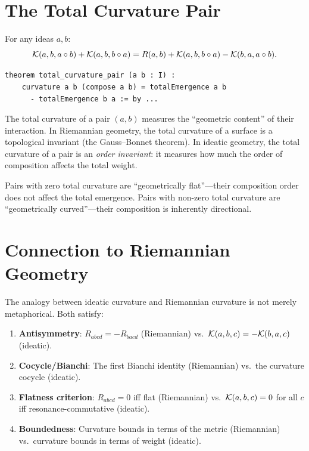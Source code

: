 \section{The Total Curvature Pair}

\begin{theorem}
\label{thm:total-curvature-pair}
For any ideas $a, b$:
\[
  \mathcal{K}(a, b, a \circ b) + \mathcal{K}(a, b, b \circ a) =
  R(a, b) + \mathcal{K}(a, b, b \circ a) - \mathcal{K}(b, a, a \circ b).
\]
\end{theorem}

\begin{lstlisting}[caption={Total curvature pair (IDT\_v3\_Emergence.lean)}]
theorem total_curvature_pair (a b : I) :
    curvature a b (compose a b) = totalEmergence a b
      - totalEmergence b a := by ...
\end{lstlisting}

\begin{interpretation}
The total curvature of a pair $(a, b)$ measures the ``geometric content'' of
their interaction. In Riemannian geometry, the total curvature of a surface
is a topological invariant (the Gauss--Bonnet theorem). In ideatic geometry,
the total curvature of a pair is an \emph{order invariant}: it measures how
much the order of composition affects the total weight.

Pairs with zero total curvature are ``geometrically flat''---their composition
order does not affect the total emergence. Pairs with non-zero total curvature
are ``geometrically curved''---their composition is inherently directional.
\end{interpretation}


\section{Connection to Riemannian Geometry}

The analogy between ideatic curvature and Riemannian curvature is not merely
metaphorical. Both satisfy:

\begin{enumerate}
  \item \textbf{Antisymmetry}: $R_{abcd} = -R_{bacd}$ (Riemannian) vs.\
    $\mathcal{K}(a,b,c) = -\mathcal{K}(b,a,c)$ (ideatic).
  \item \textbf{Cocycle/Bianchi}: The first Bianchi identity (Riemannian) vs.\
    the curvature cocycle (ideatic).
  \item \textbf{Flatness criterion}: $R_{abcd} = 0$ iff flat (Riemannian) vs.\
    $\mathcal{K}(a,b,c) = 0$ for all $c$ iff resonance-commutative (ideatic).
  \item \textbf{Boundedness}: Curvature bounds in terms of the metric (Riemannian)
    vs.\ curvature bounds in terms of weight (ideatic).
\end{enumerate}

